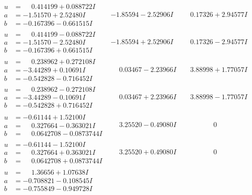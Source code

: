 \documentclass[1p]{elsarticle_modified}
\theoremstyle{definition}
\begin{document}
$$\begin{array}{c|c|c}
\begin{aligned}
u &= \phantom{-}0.414199 + 0.088722 I \\
a &= -1.51570 + 2.52480 I \\
b &= -0.167396 - 0.661515 I\end{aligned}
 & -1.85594 - 2.52906 I & \phantom{-}0.17326 + 2.94577 I \\ \hline\begin{aligned}
u &= \phantom{-}0.414199 - 0.088722 I \\
a &= -1.51570 - 2.52480 I \\
b &= -0.167396 + 0.661515 I\end{aligned}
 & -1.85594 + 2.52906 I & \phantom{-}0.17326 - 2.94577 I \\ \hline\begin{aligned}
u &= \phantom{-}0.238962 + 0.272108 I \\
a &= -3.44289 + 0.10691 I \\
b &= -0.542828 - 0.716452 I\end{aligned}
 & \phantom{-}0.03467 - 2.23966 I & \phantom{-}3.88998 + 1.77057 I \\ \hline\begin{aligned}
u &= \phantom{-}0.238962 - 0.272108 I \\
a &= -3.44289 - 0.10691 I \\
b &= -0.542828 + 0.716452 I\end{aligned}
 & \phantom{-}0.03467 + 2.23966 I & \phantom{-}3.88998 - 1.77057 I \\ \hline\begin{aligned}
u &= -0.61144 + 1.52100 I \\
a &= \phantom{-}0.327664 - 0.363021 I \\
b &= \phantom{-}0.0642708 - 0.0873744 I\end{aligned}
 & \phantom{-}3.25520 - 0.49080 I & \phantom{-0.000000 } 0 \\ \hline\begin{aligned}
u &= -0.61144 - 1.52100 I \\
a &= \phantom{-}0.327664 + 0.363021 I \\
b &= \phantom{-}0.0642708 + 0.0873744 I\end{aligned}
 & \phantom{-}3.25520 + 0.49080 I & \phantom{-0.000000 } 0 \\ \hline\begin{aligned}
u &= \phantom{-}1.36656 + 1.07638 I \\
a &= -0.708821 - 0.108545 I \\
b &= -0.755849 - 0.949728 I\end{aligned}

\end{array}$$
\end{document}
